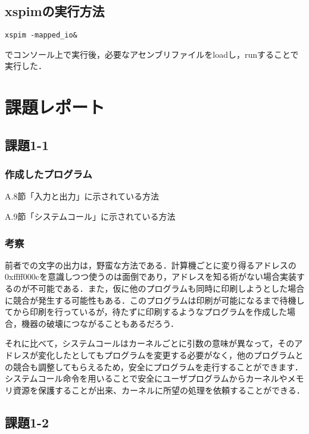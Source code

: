 \documentclass[a4j,11pt]{jarticle}
\begin{document}
\subsection{xspimの実行方法}
\begin{verbatim}
xspim -mapped_io&
\end{verbatim}
でコンソール上で実行後，必要なアセンブリファイルをloadし，runすることで実行した．
\section{課題レポート}
 \subsection{課題1-1}
  \subsubsection{作成したプログラム}
  \begin{screen}
    A.8節「入力と出力」に示されている方法
  \end{screen}
  

  \begin{screen}
    A.9節「システムコール」に示されている方法
    \end{screen}
  

  \subsubsection{考察}
  前者での文字の出力は，野蛮な方法である．計算機ごとに変り得るアドレスの0xffff000cを意識しつつ使うのは面倒であり，アドレスを知る術がない場合実装するのが不可能である．また，仮に他のプログラムも同時に印刷しようとした場合に競合が発生する可能性もある．このプログラムは印刷が可能になるまで待機してから印刷を行っているが，待たずに印刷するようなプログラムを作成した場合，機器の破壊につながることもあるだろう．

それに比べて，システムコールはカーネルごとに引数の意味が異なって，そのアドレスが変化したとしてもプログラムを変更する必要がなく，他のプログラムとの競合も調整してもらえるため，安全にプログラムを走行することができます．システムコール命令を用いることで安全にユーザプログラムからカーネルやメモリ資源を保護することが出来、カーネルに所望の処理を依頼することができる．

 \subsection{課題1-2}
\end{document}
